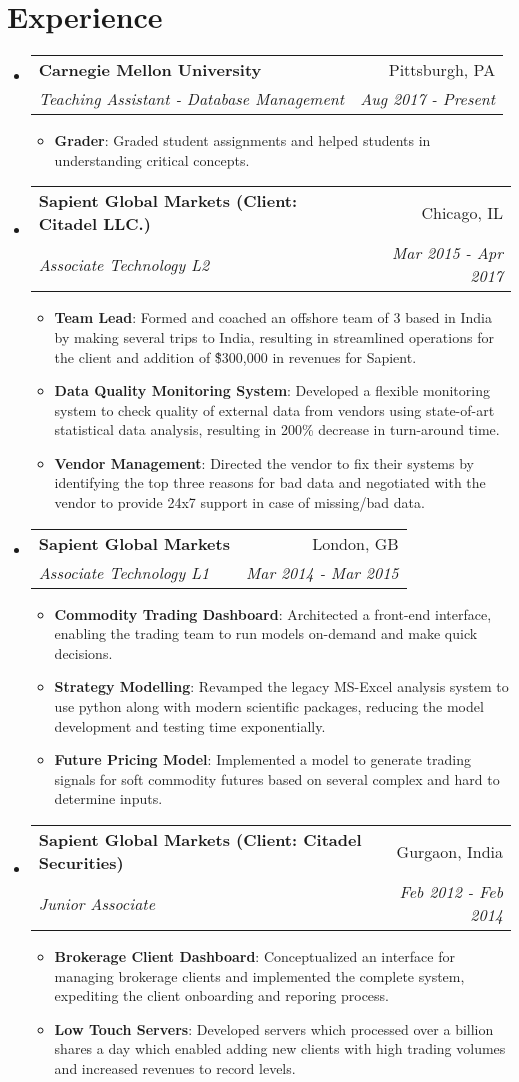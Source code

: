 \documentclass[letterpaper,10.8pt]{article}
\makeatletter
\newcommand{\resumeItem}[2]{
  \item\small{
    \textbf{#1}{: #2 \vspace{-2pt}}
  }
}
\newcommand{\resumeSubheading}[4]{
  \vspace{-1pt}\item
    \begin{tabular*}{0.97\textwidth}{l@{\extracolsep{\fill}}r}
      \textbf{#1} & #2 \\
      \textit{\small#3} & \textit{\small #4} \\
    \end{tabular*}\vspace{-5pt}
}
\newcommand{\resumeSubHeadingListStart}{\begin{itemize}[leftmargin=*]}
\newcommand{\resumeSubHeadingListEnd}{\end{itemize}}
\newcommand{\resumeItemListStart}{\begin{itemize}}
\newcommand{\resumeItemListEnd}{\end{itemize}\vspace{-5pt}}
\makeatother
\begin{document}
\section{Experience}
  \resumeSubHeadingListStart
	 \resumeSubheading
	{Carnegie Mellon University}{Pittsburgh, PA}
	{Teaching Assistant - Database Management}{Aug 2017 -  Present}
	\resumeItemListStart
	\resumeItem{Grader}
	{Graded student assignments and helped students in understanding critical concepts.}
	\resumeItemListEnd
	
    \resumeSubheading
      {Sapient Global Markets (Client: Citadel LLC.)}{Chicago, IL}
      {Associate Technology L2}{Mar 2015 - Apr 2017}
      \resumeItemListStart
        \resumeItem{Team Lead}
          {Formed and coached an offshore team of 3 based in India by making several trips to India, resulting in streamlined operations for the client and addition of \~\$300,000 in revenues for Sapient.}
          \resumeItem{Data Quality Monitoring System}
          {Developed a flexible monitoring system to check quality of external data from vendors using state-of-art statistical data analysis, resulting in 200\% decrease in turn-around time.}
          \resumeItem{Vendor Management}{Directed the vendor to fix their systems by identifying the top three reasons for bad data and negotiated with the vendor to provide 24x7 support in case of missing/bad data.}
      \resumeItemListEnd

    \resumeSubheading
	{Sapient Global Markets}{London, GB}
	{Associate Technology L1}{Mar 2014 - Mar 2015}
    \resumeItemListStart
    \resumeItem{Commodity Trading Dashboard}
    {Architected a front-end interface, enabling the trading team to run models on-demand and make quick decisions.}
    \resumeItem{Strategy Modelling}
    {Revamped the legacy MS-Excel analysis system to use python along with modern scientific packages, reducing the model development and testing time exponentially.}
    \resumeItem{Future Pricing Model}{Implemented a model to generate trading signals for soft commodity futures based on several complex and hard to determine inputs.}
    \resumeItemListEnd

    \resumeSubheading
    {Sapient Global Markets (Client: Citadel Securities)}{Gurgaon, India}
    {Junior Associate}{Feb 2012 - Feb 2014}
    \resumeItemListStart
    \resumeItem{Brokerage Client Dashboard}
    {Conceptualized an interface for managing brokerage clients and implemented the complete system, expediting the client onboarding and reporing process.}
    \resumeItem{Low Touch Servers}{Developed servers which processed over a billion shares a day which enabled adding new clients with high trading volumes and increased revenues to record levels.}
    \resumeItemListEnd
\resumeSubHeadingListEnd
\end{document}
